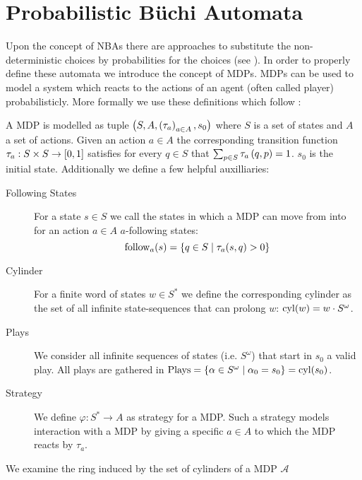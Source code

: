 \section{Probabilistic Büchi Automata}
Upon the concept of \acp{NBA} there are approaches to substitute the
non-deterministic choices by probabilities for the choices
(see \cite{RecOmeLangProbAuto,DecProblemsForProbAuto}). In order to properly
define these automata we introduce the concept of \aclp*{MDP}. \aclp*{MDP} can
be used to model a system which reacts to the actions of an agent (often called
player) probabilisticly. More formally we use
these definitions which follow \cite{RandAutoInfTrees}:
\begin{definition}
  A \acl*{MDP} is modelled as tuple
  $\left(S, A, \left(\tau_{a}\right)_{a\in A}, s_{0}\right)$ where $S$ is a set of states
  and $A$ a set of actions. Given an action $a\in A$ the corresponding
  transition function $\tau_{a}:S\times S\rightarrow \left[0,1\right]$ satisfies
  for every $q\in S$ that $\sum_{p\in S}\tau_{a}\left(q,p\right) = 1$.
  $s_{0}$ is the initial state. Additionally we define a few helpful
  auxilliaries:
  \begin{description}
    \item [Following States] For a state $s\in S$ we call the states in which a
      \ac{MDP} can move from into for an action $a\in A$ $a$-following states:
      \begin{equation*}
        \operatorname{follow}_{a}(s) = \left\{q\in S\mid \tau_{a}(s,q) > 0\right\}
      \end{equation*}
    \item [Cylinder] For a finite word of states $w\in S^{*}$ we define the
      corresponding cylinder as the set of all infinite state-sequences
      that can prolong $w$: $\operatorname{cyl}(w) = w\cdot S^{\omega}$.
    \item [Plays] We consider all infinite sequences of states
      (i.e. $S^{\omega}$) that start in $s_{0}$ a valid play. All plays
      are gathered in $\operatorname{Plays} = \left\{
        \alpha\in S^{\omega}\mid \alpha_{0} = s_{0}\right\} = \operatorname{cyl}(s_{0})$.
    \item [Strategy] We define $\varphi:S^{*}\rightarrow A$ as strategy for
      a \ac{MDP}. Such a strategy models interaction with a \ac{MDP} by
      giving a specific $a\in A$ to which the \ac{MDP} reacts by $\tau_{a}$.
  \end{description}
\end{definition}
We examine the ring induced by the set of cylinders of a \ac{MDP} $\mathcal{A}$
